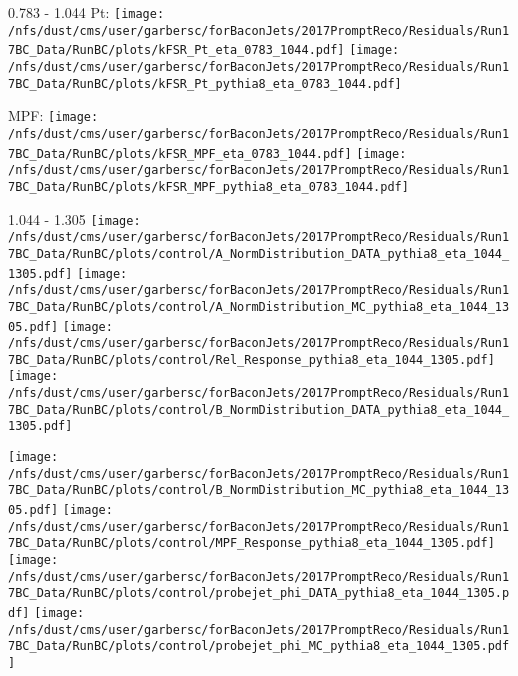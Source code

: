 \documentclass[t,compress]{beamer}
\begin{document}
\begin{frame}{0.783 - 1.044}
	 Pt: \texttt{[image: /nfs/dust/cms/user/garbersc/forBaconJets/2017PromptReco/Residuals/Run17BC\_Data/RunBC/plots/kFSR\_Pt\_eta\_0783\_1044.pdf]}
	\texttt{[image: /nfs/dust/cms/user/garbersc/forBaconJets/2017PromptReco/Residuals/Run17BC\_Data/RunBC/plots/kFSR\_Pt\_pythia8\_eta\_0783\_1044.pdf]}
\newline

	 MPF: \texttt{[image: /nfs/dust/cms/user/garbersc/forBaconJets/2017PromptReco/Residuals/Run17BC\_Data/RunBC/plots/kFSR\_MPF\_eta\_0783\_1044.pdf]}
	\texttt{[image: /nfs/dust/cms/user/garbersc/forBaconJets/2017PromptReco/Residuals/Run17BC\_Data/RunBC/plots/kFSR\_MPF\_pythia8\_eta\_0783\_1044.pdf]}
\end{frame}

\begin{frame}{1.044 - 1.305}
	\texttt{[image: /nfs/dust/cms/user/garbersc/forBaconJets/2017PromptReco/Residuals/Run17BC\_Data/RunBC/plots/control/A\_NormDistribution\_DATA\_pythia8\_eta\_1044\_1305.pdf]}
	\texttt{[image: /nfs/dust/cms/user/garbersc/forBaconJets/2017PromptReco/Residuals/Run17BC\_Data/RunBC/plots/control/A\_NormDistribution\_MC\_pythia8\_eta\_1044\_1305.pdf]}
	\texttt{[image: /nfs/dust/cms/user/garbersc/forBaconJets/2017PromptReco/Residuals/Run17BC\_Data/RunBC/plots/control/Rel\_Response\_pythia8\_eta\_1044\_1305.pdf]}
	\texttt{[image: /nfs/dust/cms/user/garbersc/forBaconJets/2017PromptReco/Residuals/Run17BC\_Data/RunBC/plots/control/B\_NormDistribution\_DATA\_pythia8\_eta\_1044\_1305.pdf]}
\newline

	\texttt{[image: /nfs/dust/cms/user/garbersc/forBaconJets/2017PromptReco/Residuals/Run17BC\_Data/RunBC/plots/control/B\_NormDistribution\_MC\_pythia8\_eta\_1044\_1305.pdf]}
	\texttt{[image: /nfs/dust/cms/user/garbersc/forBaconJets/2017PromptReco/Residuals/Run17BC\_Data/RunBC/plots/control/MPF\_Response\_pythia8\_eta\_1044\_1305.pdf]}
	\texttt{[image: /nfs/dust/cms/user/garbersc/forBaconJets/2017PromptReco/Residuals/Run17BC\_Data/RunBC/plots/control/probejet\_phi\_DATA\_pythia8\_eta\_1044\_1305.pdf]}
	\texttt{[image: /nfs/dust/cms/user/garbersc/forBaconJets/2017PromptReco/Residuals/Run17BC\_Data/RunBC/plots/control/probejet\_phi\_MC\_pythia8\_eta\_1044\_1305.pdf]}
\end{frame}
\end{document}
